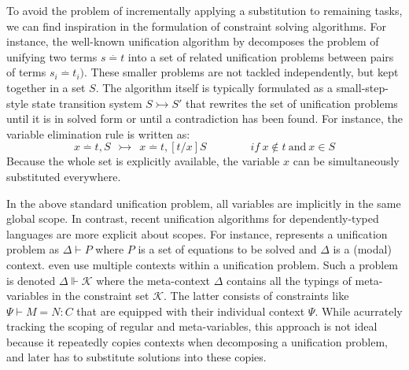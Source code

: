 To avoid the problem of incrementally applying a substitution to remaining
tasks, we can find inspiration in the formulation of constraint solving
algorithms. For instance, the well-known unification
algorithm by \citet{unification} decomposes the problem of unifying two terms $s \stackrel{.}{=} t$ into a set
of related unification problems between pairs of terms $s_i \stackrel{.}{=} t_i)$. These smaller
problems are not tackled independently, but kept together in a set $S$. 
The algorithm itself is typically formulated as a small-step-style state
transition system $S \rightarrowtail S'$ that rewrites the set of unification
problems until it is in solved form or until a contradiction has been found.
For instance, the variable elimination rule is written as:
\[
   x \stackrel{.}{=} t, S  ~~\rightarrowtail~~  x \stackrel{.}{=} t, [t/x]S   \qquad\qquad{if}~x \not\in t~\text{and}~{x \in S}
\]
Because the whole set is explicitly available, the variable $x$ can be
simultaneously substituted everywhere.

In the above standard unification problem, all variables are implicitly in the same
global scope. In contrast, recent unification algorithms for dependently-typed languages
are more explicit about scopes. For instance, \citet{Reed2009} represents a unification
problem as $\Delta \vdash P$ where $P$ is a set of equations to be solved and $\Delta$ is
a (modal) context. \citet{Abel2011higher} even use multiple contexts within a unification problem.
Such a problem is denoted $\Delta \Vdash \mathcal{K}$ where the meta-context
$\Delta$ contains all the typings of meta-variables in the constraint set
$\mathcal{K}$. The latter consists of constraints like $\Psi \vdash M = N : C$
that are equipped with their individual context $\Psi$. While acurrately tracking
the scoping of regular and meta-variables, this approach is not ideal because it
repeatedly copies contexts when decomposing a unification problem, and later has to 
substitute solutions into these copies.

